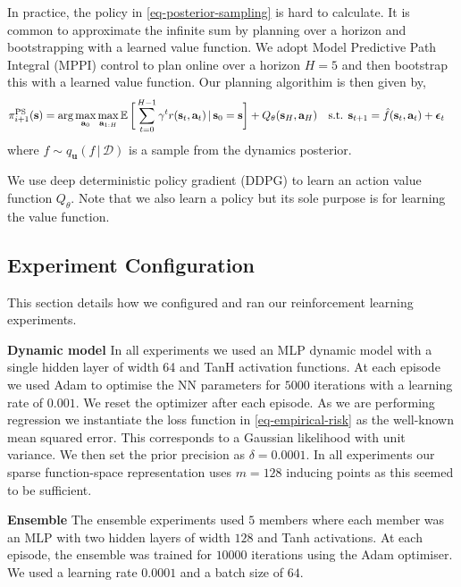 \documentclass{article}
\newcommand{\state}{\ensuremath{\mathbf{s}}}
\newcommand{\action}{\ensuremath{\mathbf{a}}}
\newcommand{\noise}{\ensuremath{\bm\epsilon}}
\newcommand{\dataset}{\ensuremath{\mathcal{D}}}
\newcommand{\Horizon}{\ensuremath{H}}
\newcommand{\transitionFn}{\ensuremath{f}}
\newcommand{\policy}{\ensuremath{\pi}}
\renewcommand{\mid}{\,|\,}
\begin{document}
In practice, the policy in \cref{eq-posterior-sampling} is hard to calculate.
It is common to approximate the infinite sum by planning over a horizon and bootstrapping with a learned value function.
We adopt Model Predictive Path Integral (MPPI) control \cite{panSample2015,williamsModel2017}
to plan online over a horizon $H=5$ and then bootstrap this with a learned value function.
Our planning algorithim is then given by,
\begin{align} \label{eq-fast-update-mpc}
  \policy_{i+1}^{\text{PS}}(\state) = \arg \max_{\action_{0}} \max_{\action_{1:\Horizon}}
\E \bigg[ \sum_{t=0}^{H-1} \gamma^{t} r(\state_{t},\action_{t}) \mid \state_{0}=\state  \bigg] + Q_{\theta}(\state_{\Horizon}, \action_{H})
\quad \text{s.t. } \state_{t+1} &= \hat{\transitionFn}(\state_{t}, \action_{t}) + \noise_{t}
\end{align}
where ${\transitionFn} \sim q_{\mathbf{u}}(\transitionFn \mid \dataset)$ is a sample from the
dynamics posterior.

We use deep deterministic policy gradient (DDPG) \cite{lillicrapContinuousControlDeep2016} to learn an action value function $Q_{\theta}$.
Note that we also learn a policy but its sole purpose is for learning the value function.

\subsection{Experiment Configuration}
This section details how we configured and ran our reinforcement learning experiments.

\textbf{Dynamic model}
In all experiments we used an MLP dynamic model with a single hidden layer of width 64 and TanH activation functions.
At each episode we used Adam \cite{adam} to optimise the NN parameters for $5000$ iterations with a learning rate of $0.001$.
We reset the optimizer after each episode.
As we are performing regression we instantiate the loss function in \cref{eq-empirical-risk} as the well-known mean squared error.
This corresponds to a Gaussian likelihood with unit variance.
We then set the prior precision as $\delta=0.0001$.
In all experiments our sparse function-space representation uses $m=128$ inducing points as this seemed to be sufficient.

\textbf{Ensemble}
The ensemble experiments used $5$ members where each member was an MLP with two hidden layers of width $128$ and Tanh activations.
At each episode, the ensemble was trained for $10000$ iterations using the Adam optimiser.
We used a learning rate $0.0001$ and a batch size of $64$.
\end{document}
